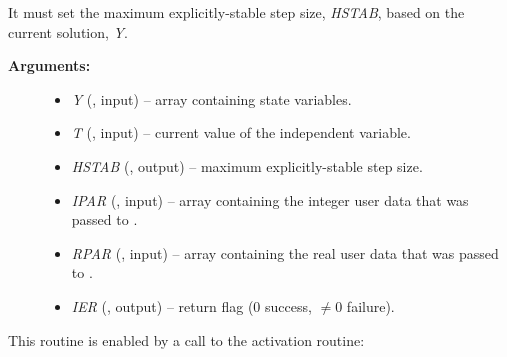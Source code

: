 \documentclass[letterpaper,10pt,english]{sphinxmanual}
\begin{document}
\begin{fulllineitems}
\label{f_interface/Usage:f/_/FARKEXPSTAB}
It must set the maximum explicitly-stable step size, \emph{HSTAB}, based
on the current solution, \emph{Y}.
\begin{description}
\item[{\textbf{Arguments:}}] \leavevmode\begin{itemize}
\item {} 
\emph{Y} (, input) -- array containing state variables.

\item {} 
\emph{T} (, input) -- current value of the independent variable.

\item {} 
\emph{HSTAB} (, output) -- maximum explicitly-stable step size.

\item {} 
\emph{IPAR} (, input) -- array containing the integer user data that was passed
to {\hyperref[f_interface/Usage:f/_/FARKMALLOC]{\emph{}}}.

\item {} 
\emph{RPAR} (, input) -- array containing the real user data that was passed to
{\hyperref[f_interface/Usage:f/_/FARKMALLOC]{\emph{}}}.

\item {} 
\emph{IER} (, output) -- return flag (0 success, \(\ne 0\) failure).

\end{itemize}

\end{description}

\end{fulllineitems}


This routine is enabled by a call to the activation routine:
\end{document}
